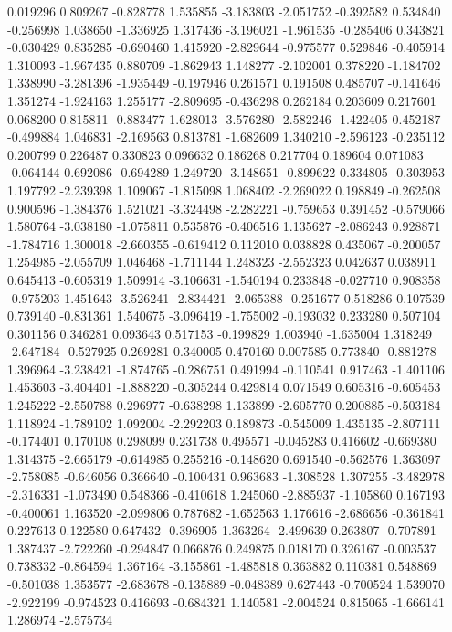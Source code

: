 0.019296
0.809267
-0.828778
1.535855
-3.183803
-2.051752
-0.392582
0.534840
-0.256998
1.038650
-1.336925
1.317436
-3.196021
-1.961535
-0.285406
0.343821
-0.030429
0.835285
-0.690460
1.415920
-2.829644
-0.975577
0.529846
-0.405914
1.310093
-1.967435
0.880709
-1.862943
1.148277
-2.102001
0.378220
-1.184702
1.338990
-3.281396
-1.935449
-0.197946
0.261571
0.191508
0.485707
-0.141646
1.351274
-1.924163
1.255177
-2.809695
-0.436298
0.262184
0.203609
0.217601
0.068200
0.815811
-0.883477
1.628013
-3.576280
-2.582246
-1.422405
0.452187
-0.499884
1.046831
-2.169563
0.813781
-1.682609
1.340210
-2.596123
-0.235112
0.200799
0.226487
0.330823
0.096632
0.186268
0.217704
0.189604
0.071083
-0.064144
0.692086
-0.694289
1.249720
-3.148651
-0.899622
0.334805
-0.303953
1.197792
-2.239398
1.109067
-1.815098
1.068402
-2.269022
0.198849
-0.262508
0.900596
-1.384376
1.521021
-3.324498
-2.282221
-0.759653
0.391452
-0.579066
1.580764
-3.038180
-1.075811
0.535876
-0.406516
1.135627
-2.086243
0.928871
-1.784716
1.300018
-2.660355
-0.619412
0.112010
0.038828
0.435067
-0.200057
1.254985
-2.055709
1.046468
-1.711144
1.248323
-2.552323
0.042637
0.038911
0.645413
-0.605319
1.509914
-3.106631
-1.540194
0.233848
-0.027710
0.908358
-0.975203
1.451643
-3.526241
-2.834421
-2.065388
-0.251677
0.518286
0.107539
0.739140
-0.831361
1.540675
-3.096419
-1.755002
-0.193032
0.233280
0.507104
0.301156
0.346281
0.093643
0.517153
-0.199829
1.003940
-1.635004
1.318249
-2.647184
-0.527925
0.269281
0.340005
0.470160
0.007585
0.773840
-0.881278
1.396964
-3.238421
-1.874765
-0.286751
0.491994
-0.110541
0.917463
-1.401106
1.453603
-3.404401
-1.888220
-0.305244
0.429814
0.071549
0.605316
-0.605453
1.245222
-2.550788
0.296977
-0.638298
1.133899
-2.605770
0.200885
-0.503184
1.118924
-1.789102
1.092004
-2.292203
0.189873
-0.545009
1.435135
-2.807111
-0.174401
0.170108
0.298099
0.231738
0.495571
-0.045283
0.416602
-0.669380
1.314375
-2.665179
-0.614985
0.255216
-0.148620
0.691540
-0.562576
1.363097
-2.758085
-0.646056
0.366640
-0.100431
0.963683
-1.308528
1.307255
-3.482978
-2.316331
-1.073490
0.548366
-0.410618
1.245060
-2.885937
-1.105860
0.167193
-0.400061
1.163520
-2.099806
0.787682
-1.652563
1.176616
-2.686656
-0.361841
0.227613
0.122580
0.647432
-0.396905
1.363264
-2.499639
0.263807
-0.707891
1.387437
-2.722260
-0.294847
0.066876
0.249875
0.018170
0.326167
-0.003537
0.738332
-0.864594
1.367164
-3.155861
-1.485818
0.363882
0.110381
0.548869
-0.501038
1.353577
-2.683678
-0.135889
-0.048389
0.627443
-0.700524
1.539070
-2.922199
-0.974523
0.416693
-0.684321
1.140581
-2.004524
0.815065
-1.666141
1.286974
-2.575734

